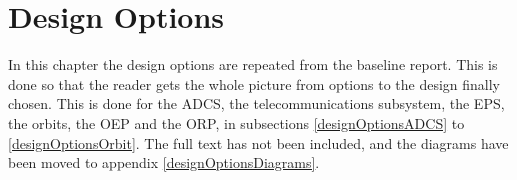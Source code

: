 \chapter{Design Options}
\label{designOptions}

In this chapter the design options are repeated from the baseline report. This is done so that the reader gets the whole picture from options to the design finally chosen. This is done for the \ac{ADCS}, the telecommunications subsystem, the \ac{EPS}, the orbits, the \ac{OEP} and the \ac{ORP}, in subsections \ref{designOptionsADCS} to \ref{designOptionsOrbit}. The full text has not been included, and the diagrams have been moved to appendix \ref{designOptionsDiagrams}.
